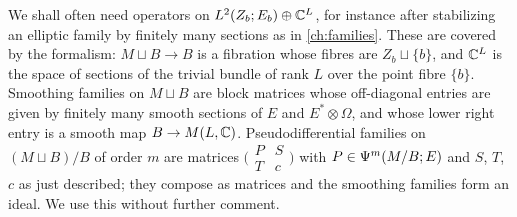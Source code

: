 \begin{remark}\label{scindex:rem:adjoin}
  We shall often need operators on $L^2(Z_b;E_b)\oplus\mathbb{C}^L$, for instance after
  stabilizing an elliptic family by finitely many sections as in
  \cref{ch:families}. These are covered by the formalism: $M\sqcup B\to B$ is a
  fibration whose fibres are $Z_b\sqcup\{b\}$, and $\mathbb{C}^L$ is the space of sections
  of the trivial bundle of rank $L$ over the point fibre $\{b\}$. Smoothing
  families on $M\sqcup B$ are block matrices whose off-diagonal entries are given
  by finitely many smooth sections of $E$ and $E^*\otimes\Omega$, and whose
  lower right entry is a smooth map $B\to M(L,\mathbb{C})$. Pseudodifferential families
  on $(M\sqcup B)/B$ of order $m$ are matrices $\bigl(\begin{smallmatrix}P&S\\
  T&c\end{smallmatrix}\bigr)$ with $P\in\Psi^{m}(M/B;E)$ and $S$, $T$, $c$ as
  just described; they compose as matrices and the smoothing families form an
  ideal. We use this without further comment.
\end{remark}


